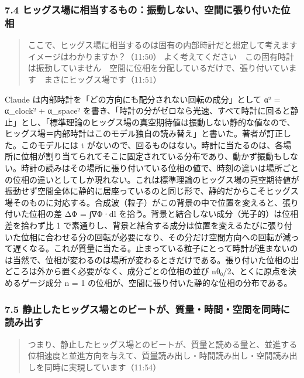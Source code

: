 \documentclass[
  a4paper,
]{ltjsarticle}
\begin{document}
\subsubsection{7.4
ヒッグス場に相当するもの：振動しない、空間に張り付いた位相}\label{ux30d2ux30c3ux30b0ux30b9ux5834ux306bux76f8ux5f53ux3059ux308bux3082ux306eux632fux52d5ux3057ux306aux3044ux7a7aux9593ux306bux5f35ux308aux4ed8ux3044ux305fux4f4dux76f8}

\begin{quote}
ここで、ヒッグス場に相当するのは固有の内部時計だと想定して考えます　イメージはわかりますか？（11:50）
よく考えてください　この固有時計は振動していません　空間に位相を分配しているだけで、張り付いています　まさにヒッグス場です（11:51）
\end{quote}

Claude は内部時計を「どの方向にも配分されない回転の成分」として α² =
α\_clock² + α\_space²
を書き、「時計の分がゼロなら光速、すべて時計に回ると静止」とし、「標準理論のヒッグス場の真空期待値は振動しない静的な値なので、ヒッグス場＝内部時計はこのモデル独自の読み替え」と書いた。著者が訂正した。このモデルには
t
がないので、回るものはない。時計に当たるのは、各場所に位相が割り当てられてそこに固定されている分布であり、動かず振動もしない。時計の読みはその場所に張り付いている位相の値で、時刻の違いは場所ごとの位相の違いとしてしか現れない。これは標準理論のヒッグス場の真空期待値が振動せず空間全体に静的に居座っているのと同じ形で、静的だからこそヒッグス場そのものに対応する。合成波（粒子）がこの背景の中で位置を変えると、張り付いた位相の差
ΔΦ = ∫∇Φ·dl を拾う。背景と結合しない成分（光子的）は位相差を拾わず比 1
で素通りし、背景と結合する成分は位置を変えるたびに張り付いた位相に合わせる分の回転が必要になり、その分だけ空間方向への回転が減って遅くなる。これが質量に当たる。止まっている粒子にとって時計が進まないのは当然で、位相が変わるのは場所が変わるときだけである。張り付いた位相の出どころは外から置く必要がなく、成分ごとの位相の並び
nθ₀/2、とくに原点を決めるゲージ成分 n = 1
の位相が、空間に張り付いた静的な位相の分布である。

\subsubsection{7.5
静止したヒッグス場とのビートが、質量・時間・空間を同時に読み出す}\label{ux9759ux6b62ux3057ux305fux30d2ux30c3ux30b0ux30b9ux5834ux3068ux306eux30d3ux30fcux30c8ux304cux8ceaux91cfux6642ux9593ux7a7aux9593ux3092ux540cux6642ux306bux8aadux307fux51faux3059}

\begin{quote}
つまり、静止したヒッグス場とのビートが、質量と読める量と、並進する位相速度と並進方向を与えて、質量読み出し・時間読み出し・空間読み出しを同時に実現しています（11:54）
\end{quote}
\end{document}
